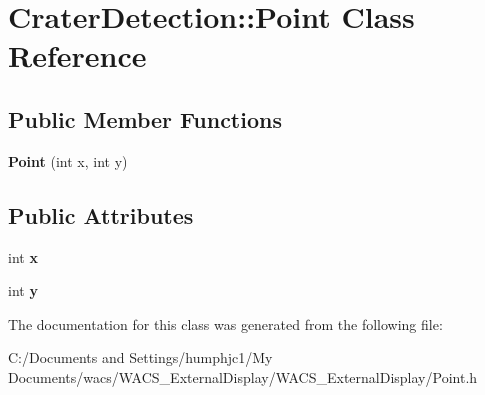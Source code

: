 \hypertarget{class_crater_detection_1_1_point}{
\section{CraterDetection::Point Class Reference}
\label{class_crater_detection_1_1_point}
}
\subsection*{Public Member Functions}
\begin{DoxyCompactItemize}
\item 
\hypertarget{class_crater_detection_1_1_point_a22f1942ad1791fdd8447a706a8e48380}{
{\bfseries Point} (int x, int y)}
\label{class_crater_detection_1_1_point_a22f1942ad1791fdd8447a706a8e48380}

\end{DoxyCompactItemize}
\subsection*{Public Attributes}
\begin{DoxyCompactItemize}
\item 
\hypertarget{class_crater_detection_1_1_point_a06b5b66d1c5ea67551c3700420dee8ac}{
int {\bfseries x}}
\label{class_crater_detection_1_1_point_a06b5b66d1c5ea67551c3700420dee8ac}

\item 
\hypertarget{class_crater_detection_1_1_point_a4925e073c87f1dbf1860bf7026253bc8}{
int {\bfseries y}}
\label{class_crater_detection_1_1_point_a4925e073c87f1dbf1860bf7026253bc8}

\end{DoxyCompactItemize}


The documentation for this class was generated from the following file:\begin{DoxyCompactItemize}
\item 
C:/Documents and Settings/humphjc1/My Documents/wacs/WACS\_\-ExternalDisplay/WACS\_\-ExternalDisplay/Point.h\end{DoxyCompactItemize}
